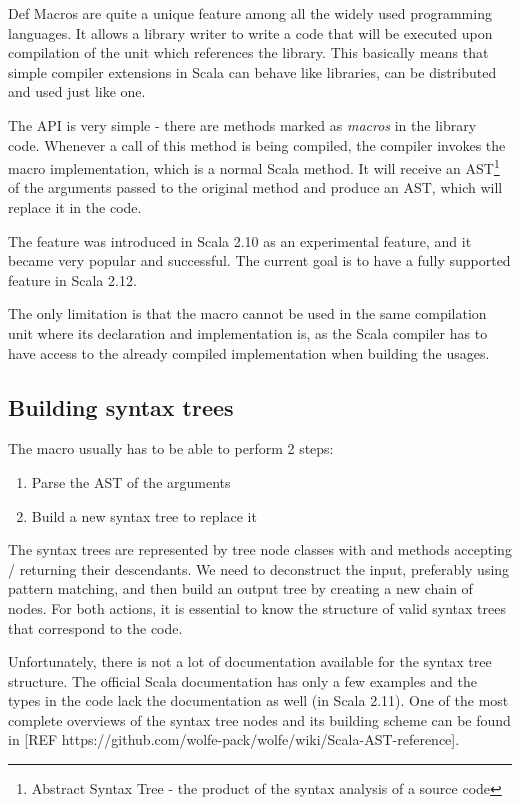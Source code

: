 Def Macros are quite a unique feature among all the widely used programming languages. It allows a library writer to write a code that will be executed upon compilation of the unit which references the library. This basically means that simple compiler extensions in Scala can behave like libraries, can be distributed and used just like one.

The API is very simple - there are methods marked as \textit{macros} in the library code. Whenever a call of this method is being compiled, the compiler invokes the macro implementation, which is a normal Scala method. It will receive an AST\footnote{Abstract Syntax Tree - the product of the syntax analysis of a source code} of the arguments passed to the original method and produce an AST, which will replace it in the code.

The feature was introduced in Scala 2.10 as an experimental feature, and it became very popular and successful. The current goal is to have a fully supported feature in Scala 2.12.


The only limitation is that the macro cannot be used in the same compilation unit where its declaration and implementation is, as the Scala compiler has to have access to the already compiled implementation when building the usages.

\subsection{Building syntax trees}
\label{subsec:buildingast}

The macro usually has to be able to perform 2 steps:

\begin{enumerate}
	\item Parse the AST of the arguments
	\item Build a new syntax tree to replace it
\end{enumerate}

The syntax trees are represented by tree node classes with  and  methods accepting / returning their descendants. We need to deconstruct the input, preferably using pattern matching, and then build an output tree by creating a new chain of nodes. For both actions, it is essential to know the structure of valid syntax trees that correspond to the code.

Unfortunately, there is not a lot of documentation available for the syntax tree structure. The official Scala documentation has only a few examples and the types in the code lack the documentation as well (in Scala 2.11). One of the most complete overviews of the syntax tree nodes and its building scheme can be found in [REF https://github.com/wolfe-pack/wolfe/wiki/Scala-AST-reference].

